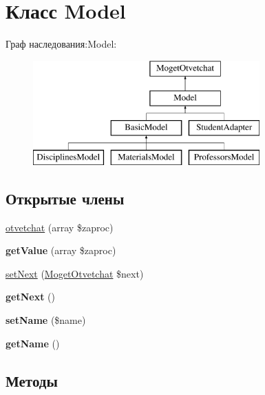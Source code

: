 \hypertarget{classModel}{}\section{Класс Model}
\label{classModel}
Граф наследования\+:Model\+:\begin{figure}[H]
\begin{center}
\leavevmode
\includegraphics[height=4.000000cm]{classModel}
\end{center}
\end{figure}
\subsection*{Открытые члены}
\begin{DoxyCompactItemize}
\item 
\hyperlink{classModel_a63b113c5ec29c2295af8c097402f71f2}{otvetchat} (array \$zaproc)
\item 
\hypertarget{classModel_afb2431e9128d7e08adf8b1b71c33df01}{}{\bfseries get\+Value} (array \$zaproc)\label{classModel_afb2431e9128d7e08adf8b1b71c33df01}

\item 
\hyperlink{classModel_ac06d31e467a180c245c13a59fb6132f3}{set\+Next} (\hyperlink{interfaceMogetOtvetchat}{Moget\+Otvetchat} \$next)
\item 
\hypertarget{classModel_af63457f86c986fe181bd0501f90a9fde}{}{\bfseries get\+Next} ()\label{classModel_af63457f86c986fe181bd0501f90a9fde}

\item 
\hypertarget{classModel_a4f6f22d1c991579ccd4e56b09c20ef2b}{}{\bfseries set\+Name} (\$name)\label{classModel_a4f6f22d1c991579ccd4e56b09c20ef2b}

\item 
\hypertarget{classModel_a99ae6ab8071fc0d1e62894ce22edf5ad}{}{\bfseries get\+Name} ()\label{classModel_a99ae6ab8071fc0d1e62894ce22edf5ad}

\end{DoxyCompactItemize}


\subsection{Методы}
\hypertarget{classModel_a63b113c5ec29c2295af8c097402f71f2}{}
